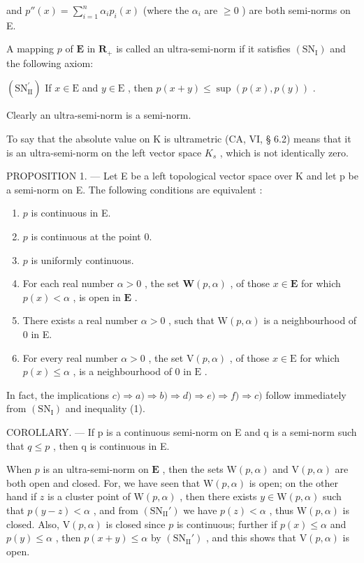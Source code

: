 and \(p''(x) = \sum_{i=1}^{n} \alpha_i p_i(x)\) (where the \(\alpha_i\) are \(\geqslant 0\) ) are both semi-norms on E.

A mapping \(p\) of \(\mathbf{E}\) in \(\mathbf{R}_{+}\) is called an ultra-semi-norm if it satisfies \((\mathrm{SN}_{\mathrm{I}})\) and the following axiom:

\((\mathrm{SN}_{\mathrm{II}}^{\prime})\) If \(x \in \mathrm{E}\) and \(y \in \mathrm{E}\) , then \(p(x + y) \leqslant \sup(p(x), p(y))\) .

Clearly an ultra-semi-norm is a semi-norm.

To say that the absolute value on K is ultrametric (CA, VI, § 6.2) means that it is an ultra-semi-norm on the left vector space \(K_{s}\) , which is not identically zero.

PROPOSITION 1. --- Let E be a left topological vector space over K and let p be a semi-norm on E. The following conditions are equivalent :

\begin{enumerate}
\def\labelenumi{\alph{enumi})}
\item
  \(p\) is continuous in E.
\item
  \(p\) is continuous at the point 0.
\item
  \(p\) is uniformly continuous.
\item
  For each real number \(\alpha > 0\) , the set \(\mathbf{W}(p, \alpha)\) , of those \(x \in \mathbf{E}\) for which \(p(x) < \alpha\) , is open in \(\mathbf{E}\) .
\item
  There exists a real number \(\alpha > 0\) , such that \(\mathrm{W}(p, \alpha)\) is a neighbourhood of 0 in E.
\item
  For every real number \(\alpha > 0\) , the set \(\mathrm{V}(p, \alpha)\) , of those \(x \in \mathrm{E}\) for which \(p(x) \leqslant \alpha\) , is a neighbourhood of 0 in \(\mathrm{E}\) .
\end{enumerate}

In fact, the implications \(c) \Rightarrow a) \Rightarrow b) \Rightarrow d) \Rightarrow e) \Rightarrow f) \Rightarrow c)\) follow immediately from \((\mathrm{SN}_{\mathrm{I}})\) and inequality (1).

COROLLARY. --- If p is a continuous semi-norm on E and q is a semi-norm such that \(q \leqslant p\) , then q is continuous in E.

When \(p\) is an ultra-semi-norm on \(\mathbf{E}\) , then the sets \(\mathrm{W}(p, \alpha)\) and \(\mathrm{V}(p, \alpha)\) are both open and closed. For, we have seen that \(\mathrm{W}(p, \alpha)\) is open; on the other hand if \(z\) is a cluster point of \(\mathrm{W}(p, \alpha)\) , then there exists \(y \in \mathrm{W}(p, \alpha)\) such that \(p(y - z) < \alpha\) , and from \((\mathrm{SN}_{\mathrm{II}}')\) we have \(p(z) < \alpha\) , thus \(\mathrm{W}(p, \alpha)\) is closed. Also, \(\mathrm{V}(p, \alpha)\) is closed since \(p\) is continuous; further if \(p(x) \leqslant \alpha\) and \(p(y) \leqslant \alpha\) , then \(p(x + y) \leqslant \alpha\) by \((\mathrm{SN}_{\mathrm{II}}')\) , and this shows that \(\mathrm{V}(p, \alpha)\) is open.

